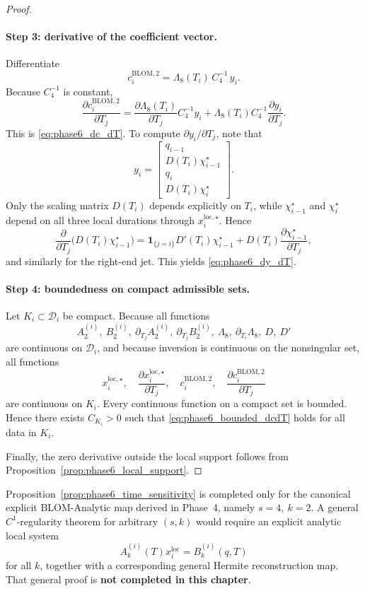 \begin{proof}
\paragraph{Step 3: derivative of the coefficient vector.}
Differentiate
\[
c_i^{\mathrm{BLOM},2}
=
\Lambda_8(T_i)\,C_4^{-1}\,y_i.
\]
Because \(C_4^{-1}\) is constant,
\[
\frac{\partial c_i^{\mathrm{BLOM},2}}{\partial T_j}
=
\frac{\partial \Lambda_8(T_i)}{\partial T_j}C_4^{-1}y_i
+
\Lambda_8(T_i)C_4^{-1}\frac{\partial y_i}{\partial T_j}.
\]
This is \eqref{eq:phase6_dc_dT}.
To compute \(\partial y_i/\partial T_j\), note that
\[
y_i
=
\begin{bmatrix}
q_{i-1}\\
D(T_i)\chi_{i-1}^\star\\
q_i\\
D(T_i)\chi_i^\star
\end{bmatrix}.
\]
Only the scaling matrix \(D(T_i)\) depends explicitly on \(T_i\), while \(\chi_{i-1}^\star\) and \(\chi_i^\star\) depend on all three local durations through \(x_i^{\mathrm{loc},\star}\).
Hence
\[
\frac{\partial}{\partial T_j}\bigl(D(T_i)\chi_{i-1}^\star\bigr)
=
\mathbf 1_{\{j=i\}}D'(T_i)\chi_{i-1}^\star
+
D(T_i)\frac{\partial \chi_{i-1}^\star}{\partial T_j},
\]
and similarly for the right-end jet.
This yields \eqref{eq:phase6_dy_dT}.

\paragraph{Step 4: boundedness on compact admissible sets.}
Let \(K_i\subset\mathcal D_i\) be compact.
Because all functions
\[
A_2^{(i)},\ B_2^{(i)},\ \partial_{T_j}A_2^{(i)},\ \partial_{T_j}B_2^{(i)},\ 
\Lambda_8,\ \partial_{T_i}\Lambda_8,\ D,\ D'
\]
are continuous on \(\mathcal D_i\), and because inversion is continuous on the nonsingular set, all functions
\[
x_i^{\mathrm{loc},\star},\quad
\frac{\partial x_i^{\mathrm{loc},\star}}{\partial T_j},\quad
c_i^{\mathrm{BLOM},2},\quad
\frac{\partial c_i^{\mathrm{BLOM},2}}{\partial T_j}
\]
are continuous on \(K_i\).
Every continuous function on a compact set is bounded.
Hence there exists \(C_{K_i}>0\) such that \eqref{eq:phase6_bounded_dcdT} holds for all data in \(K_i\).

Finally, the zero derivative outside the local support follows from Proposition~\ref{prop:phase6_local_support}.
\end{proof}

\begin{remark}[Marked limitation for Proposition~\ref{prop:phase6_time_sensitivity}]
\label{rem:phase6_prop4_limitation}
Proposition~\ref{prop:phase6_time_sensitivity} is completed only for the canonical explicit BLOM-Analytic map derived in Phase~4, namely \(s=4,\ k=2\).
A general \(C^1\)-regularity theorem for arbitrary \((s,k)\) would require an explicit analytic local system
\[
A_k^{(i)}(T)x_i^{\mathrm{loc}}=B_k^{(i)}(q,T)
\]
for all \(k\), together with a corresponding general Hermite reconstruction map.
That general proof is \textbf{not completed in this chapter}.
\end{remark}

